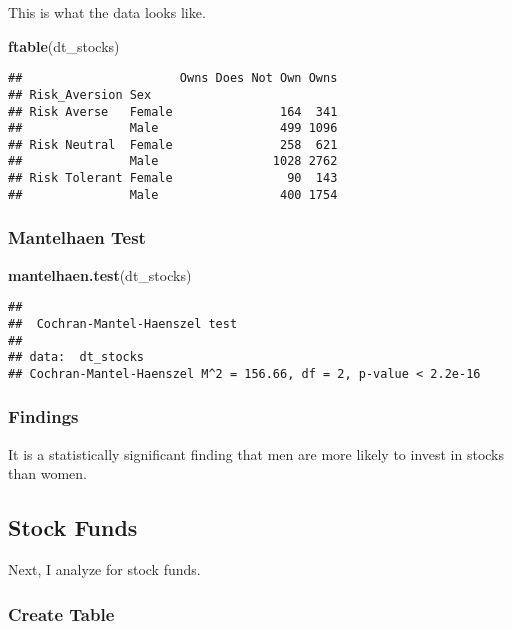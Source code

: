 \documentclass[
]{article}
\newenvironment{Shaded}{\begin{snugshade}}{\end{snugshade}}
\newcommand{\KeywordTok}[1]{\textcolor[rgb]{0.13,0.29,0.53}{\textbf{#1}}}
\newcommand{\NormalTok}[1]{#1}
\begin{document}
This is what the data looks like.

\begin{Shaded}
\begin{Highlighting}[]
\KeywordTok{ftable}\NormalTok{(dt_stocks)}
\end{Highlighting}
\end{Shaded}

\begin{verbatim}
##                      Owns Does Not Own Owns
## Risk_Aversion Sex                          
## Risk Averse   Female               164  341
##               Male                 499 1096
## Risk Neutral  Female               258  621
##               Male                1028 2762
## Risk Tolerant Female                90  143
##               Male                 400 1754
\end{verbatim}

\hypertarget{mantelhaen-test-1}{%
\subsubsection{Mantelhaen Test}\label{mantelhaen-test-1}}

\begin{Shaded}
\begin{Highlighting}[]
\KeywordTok{mantelhaen.test}\NormalTok{(dt_stocks)}
\end{Highlighting}
\end{Shaded}

\begin{verbatim}
## 
##  Cochran-Mantel-Haenszel test
## 
## data:  dt_stocks
## Cochran-Mantel-Haenszel M^2 = 156.66, df = 2, p-value < 2.2e-16
\end{verbatim}

\hypertarget{findings-1}{%
\subsubsection{Findings}\label{findings-1}}

It is a statistically significant finding that men are more likely to
invest in stocks than women.

\hypertarget{stock-funds}{%
\subsection{Stock Funds}\label{stock-funds}}

Next, I analyze for stock funds.

\hypertarget{create-table-1}{%
\subsubsection{Create Table}\label{create-table-1}}
\end{document}
